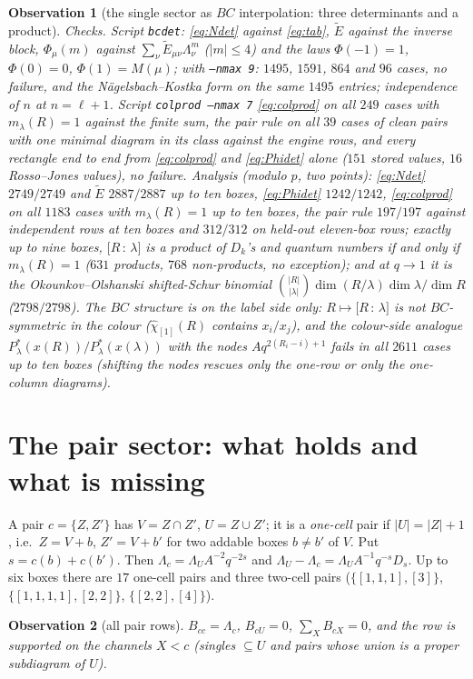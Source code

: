 \documentclass[11pt]{article}
\newtheorem{observation}{Observation}
\newcommand{\Lam}{\Lambda}
\newcommand{\Et}{\widetilde{E}}
\newcommand{\LMPH}[1]{\texttt{#1}}
\newcommand{\chih}{\hat\chi}
\newcommand{\cf}[2]{\bigl[#1\,{:}\,#2\bigr]}
\begin{document}
\begin{observation}[the single sector as $BC$ interpolation: three determinants and a product]
\emph{Checks.}  Script \LMPH{bcdet}: \eqref{eq:Ndet} against \eqref{eq:tab}, $\Et$ against the inverse block, $\Phi_\mu(m)$
against $\sum_\nu\Et_{\mu\nu}\Lam_\nu^m$ ($|m|\le4$) and the laws $\Phi(-1)=1$, $\Phi(0)=0$, $\Phi(1)=M(\mu)$; with
\LMPH{--nmax 9}: $1495$, $1591$, $864$ and $96$ cases, no failure, and the N\"agelsbach--Kostka form on the same $1495$
entries; independence of $n$ at $n=\ell+1$.  Script \LMPH{colprod --nmax 7}
\eqref{eq:colprod} on all $249$ cases with $m_\lambda(R)=1$ against the finite sum, the pair rule on all $39$
cases of clean pairs with one minimal diagram in its class against the engine rows, and every rectangle end to end from
\eqref{eq:colprod} and \eqref{eq:Phidet} alone ($151$ stored values, $16$ Rosso--Jones values), no failure.  Analysis
(modulo $p$, two points): \eqref{eq:Ndet} $2749/2749$ and $\Et$ $2887/2887$ up to ten boxes, \eqref{eq:Phidet} $1242/1242$,
\eqref{eq:colprod} on all $1183$ cases with $m_\lambda(R)=1$ up to ten boxes, the pair rule $197/197$ against independent
rows at ten boxes and $312/312$ on held-out eleven-box rows; exactly up to nine boxes, $\cf R\lambda$ is a product of $D_k$'s
and quantum numbers \emph{if and only if} $m_\lambda(R)=1$ ($631$ products, $768$ non-products, no exception); and at
$q\to1$ it is the Okounkov--Olshanski shifted-Schur binomial $\binom{|R|}{|\lambda|}\dim(R/\lambda)\dim\lambda/\dim R$
($2798/2798$).  The $BC$ structure is on the label side only: $R\mapsto\cf R\lambda$ is not $BC$-symmetric in the colour
($\chih_{[1]}(R)$ contains $x_i/x_j$), and the colour-side analogue $P^*_\lambda(x(R))/P^*_\lambda(x(\lambda))$ with the
nodes $Aq^{2(R_i-i)+1}$ fails in all $2611$ cases up to ten boxes (shifting the nodes rescues only the one-row or only the
one-column diagrams).
\end{observation}

\section{The pair sector: what holds and what is missing}\label{sec:pairs}

A pair $c=\{Z,Z'\}$ has $V=Z\cap Z'$, $U=Z\cup Z'$; it is a \emph{one-cell} pair if $|U|=|Z|+1$, i.e.\ $Z=V+b$,
$Z'=V+b'$ for two addable boxes $b\ne b'$ of $V$.  Put $s=c(b)+c(b')$.  Then $\Lam_c=\Lam_U A^{-2}q^{-2s}$ and
$\Lam_U-\Lam_c=\Lam_U A^{-1}q^{-s}D_s$.  Up to six boxes there are $17$ one-cell pairs and three two-cell pairs
($\{[1,1,1],[3]\}$, $\{[1,1,1,1],[2,2]\}$, $\{[2,2],[4]\}$).

\begin{observation}[all pair rows]\label{obs:all}
$B_{cc}=\Lam_c$, $B_{cU}=0$, $\sum_X B_{cX}=0$, and the row is supported on the channels $X<c$ (singles
$\subseteq U$ and pairs whose union is a proper subdiagram of $U$).
\end{observation}
\end{document}

